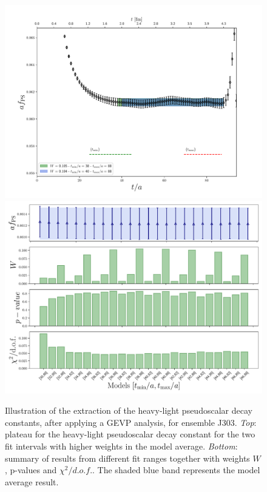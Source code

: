 \begin{figure}
	\centering
	\includegraphics[scale=0.5]{./cap6/figs/fds/f8_plateau.pdf}
	\includegraphics[scale=0.5]{./cap6/figs/fds/f8_BMA.pdf}
	\caption{Illustration of the extraction of the heavy-light pseudoscalar decay constants, after applying a GEVP analysis, for ensemble J303. \textit{Top}: plateau for the heavy-light pseudoscalar decay constant for the two fit intervals with higher weights in the model average. \textit{Bottom}: summary of results from  different fit ranges together with weights $W$, p-values and $\chi^2/d.o.f.$. The shaded blue band represents the model average result. }
	\label{fig:decay_plateau} 
\end{figure}


